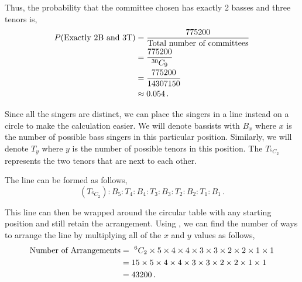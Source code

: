 \begin{subquestions}
\begin{subsubquestions}
Thus, the probability that the committee chosen has exactly 2 basses and three tenors is,
\begin{align}
	P(\text{Exactly 2B and 3T}) & = \frac{775200}{\text{Total number of committees}} \nonumber \\
	                            & = \frac{775200}{^{30}C_9} \nonumber \\
	                            & = \frac{775200}{14307150} \nonumber \\
	                            & \approx 0.054 \,.
\end{align}


\subsubquestion 

Since all the singers are distinct, we can place the singers in a line instead on a circle to make the calculation easier. We will denote bassists with $B_x$ where $x$ is the number of possible bass singers in this particular position. Similarly, we will denote $T_y$ where $y$ is the number of possible tenors in this position. The $T_{^6C_2}$ represents the two tenors that are next to each other.

The line can be formed as follows,
\begin{equation}
	(T_{^6C_2}):B_5: T_4: B_4: T_3: B_3: T_2: B_2: T_1: B_1 \,.
\end{equation}

This line can then be wrapped around the circular table with any starting position and still retain the arrangement. Using , we can find the number of ways to arrange the line by multiplying all of the $x$ and $y$ values as follows,
\begin{align}
	\text{Number of Arrangements} & = ~^6C_2 \times 5\times 4\times 4\times 3\times 3\times 2\times 2\times 1\times 1 \nonumber \\
	                       & = 15 \times 5\times 4\times 4\times 3\times 3\times 2\times 2\times 1\times 1 \nonumber \\
	                       & = 43200 \,.
\end{align}

\end{subsubquestions}
	
	
	
\end{subquestions}